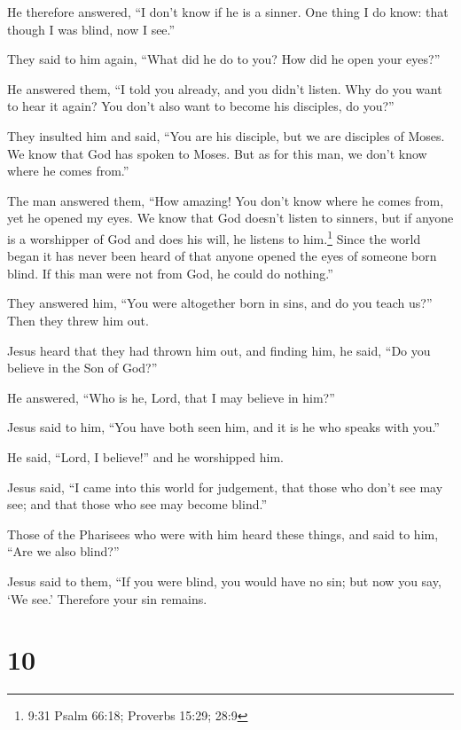  He therefore answered, ``I don't know if he is a sinner.
One thing I do know: that though I was blind, now I see.''

 They said to him again, ``What did he do to you? How did
he open your eyes?''

 He answered them, ``I told you already, and you didn't
listen. Why do you want to hear it again? You don't also want to become
his disciples, do you?''

 They insulted him and said, ``You are his disciple, but we
are disciples of Moses.  We know that God has spoken to
Moses. But as for this man, we don't know where he comes from.''

 The man answered them, ``How amazing! You don't know where
he comes from, yet he opened my eyes.  We know that God
doesn't listen to sinners, but if anyone is a worshipper of God and does
his will, he listens to him.\footnote{9:31 Psalm 66:18; Proverbs 15:29;
  28:9}  Since the world began it has never been heard of
that anyone opened the eyes of someone born blind.  If this
man were not from God, he could do nothing.''

 They answered him, ``You were altogether born in sins, and
do you teach us?'' Then they threw him out.

 Jesus heard that they had thrown him out, and finding him,
he said, ``Do you believe in the Son of God?''

 He answered, ``Who is he, Lord, that I may believe in
him?''

 Jesus said to him, ``You have both seen him, and it is he
who speaks with you.''

 He said, ``Lord, I believe!'' and he worshipped him.

 Jesus said, ``I came into this world for judgement, that
those who don't see may see; and that those who see may become blind.''

 Those of the Pharisees who were with him heard these
things, and said to him, ``Are we also blind?''

 Jesus said to them, ``If you were blind, you would have no
sin; but now you say, `We see.' Therefore your sin remains.

\hypertarget{section-9}{%
\section{10}\label{section-9}}

